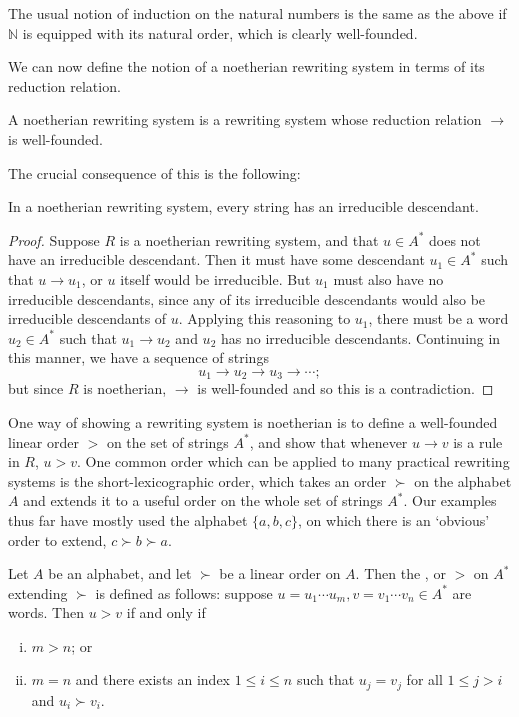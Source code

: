 \documentclass[noindex,noinsetproof,emphthm,12pt]{lmaths}
\begin{document}
The usual notion of induction on the natural numbers is the same as the above if $\mathbb{N}$ is equipped with its natural order, which is clearly well-founded.

We can now define the notion of a noetherian rewriting system in terms of its reduction relation.

\begin{defn}
	A noetherian rewriting system is a rewriting system whose reduction relation $\rightarrow$ is well-founded.
\end{defn}

The crucial consequence of this is the following:

\begin{prop}
	In a noetherian rewriting system, every string has an irreducible descendant. \label{prop:noetherian-every-irred}
\end{prop}
\begin{proof}
	Suppose $R$ is a noetherian rewriting system, and that $u \in A^*$ does not have an irreducible descendant. Then it must have some descendant $u_1 \in A^*$ such that $u \to u_1$, or $u$ itself would be irreducible. But $u_1$ must also have no irreducible descendants, since any of its irreducible descendants would also be irreducible descendants of $u$. Applying this reasoning to $u_1$, there must be a word $u_2 \in A^*$ such that $u_1 \to u_2$ and $u_2$ has no irreducible descendants. Continuing in this manner, we have a sequence of strings
		\[ u_1 \to u_2 \to u_3 \to \cdots; \]
	but since $R$ is noetherian, $\to$ is well-founded and so this is a contradiction.
\end{proof}

One way of showing a rewriting system is noetherian is to define a well-founded linear order $>$ on the set of strings $A^*$, and show that whenever $u \to v$ is a rule in $R$, $u > v$. One common order which can be applied to many practical rewriting systems is the short-lexicographic order, which takes an order $\succ$ on the alphabet $A$ and extends it to a useful order on the whole set of strings $A^*$. Our examples thus far have mostly used the alphabet $\{a, b, c\}$, on which there is an `obvious' order to extend, $c \succ b \succ a$.

\begin{defn}
	Let $A$ be an alphabet, and let $\succ$ be a linear order on $A$. Then the , or  $>$ on $A^*$ extending $\succ$ is defined as follows: suppose $u = u_1\cdots u_m, v = v_1\cdots v_n \in A^*$ are words. Then $u > v$ if and only if
	\begin{enumerate}[(i)]
		\item $m > n$; or
		\item $m = n$ and there exists an index $1 \le i \le n$ such that $u_j = v_j$ for all $1 \le j > i$ and $u_i \succ v_i$.
	\end{enumerate}
\end{defn}
\end{document}
